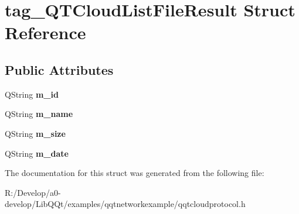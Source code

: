 \hypertarget{structtag___q_t_cloud_list_file_result}{}\section{tag\+\_\+\+Q\+T\+Cloud\+List\+File\+Result Struct Reference}
\label{structtag___q_t_cloud_list_file_result}
\subsection*{Public Attributes}
\begin{DoxyCompactItemize}
\item 
\mbox{\label{structtag___q_t_cloud_list_file_result_a97b9d82cbeaeddac43ec9ffbb9448eda}} 
Q\+String {\bfseries m\+\_\+id}
\item 
\mbox{\label{structtag___q_t_cloud_list_file_result_a92156bcb1efb188a9bfda08e6e04765f}} 
Q\+String {\bfseries m\+\_\+name}
\item 
\mbox{\label{structtag___q_t_cloud_list_file_result_a063c011174afecf06f3e9496c1e46b9a}} 
Q\+String {\bfseries m\+\_\+size}
\item 
\mbox{\label{structtag___q_t_cloud_list_file_result_a5622e4fea5d8c510f11640053c1a0617}} 
Q\+String {\bfseries m\+\_\+date}
\end{DoxyCompactItemize}


The documentation for this struct was generated from the following file\+:\begin{DoxyCompactItemize}
\item 
R\+:/\+Develop/a0-\/develop/\+Lib\+Q\+Qt/examples/qqtnetworkexample/qqtcloudprotocol.\+h\end{DoxyCompactItemize}
